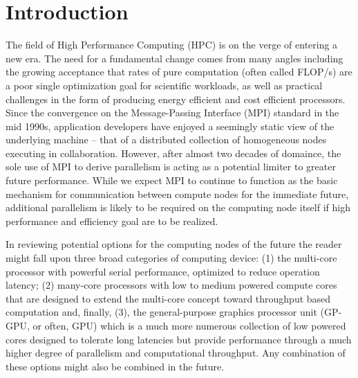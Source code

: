 

\section{Introduction}
\label{C:intro}

\noindent
The field of High Performance Computing (HPC) is on the verge of entering a new era. The need
for a fundamental change comes from many angles including the growing acceptance that rates of
pure computation (often called FLOP/s) are a poor single optimization goal for scientific
workloads, as well as practical challenges in the form of producing energy efficient and cost
efficient processors. Since the convergence on the Message-Passing Interface (MPI) standard
in the mid 1990s, application developers have enjoyed a seemingly static view of the 
underlying machine --
that of a distributed collection of homogeneous nodes executing in collaboration. However, 
after almost two decades of domaince, the sole use of MPI to derive parallelism is acting as
a potential limiter to greater future performance. While we expect MPI to continue to function
as the basic mechanism for communication between compute nodes for the immediate future, 
additional parallelism is
likely to be required on the computing node itself if high performance and efficiency goal 
are to be realized.

In reviewing potential options for the computing nodes of the future the reader might fall
upon three broad categories of computing device: (1) the multi-core processor with powerful
serial performance, optimized to reduce operation latency; (2) many-core processors with
low to medium powered compute cores that are designed to extend the multi-core concept toward
throughput based computation and, finally, (3), the general-purpose graphics processor unit
(GP-GPU, or often, GPU) which is a much more numerous collection of low powered cores designed
to tolerate long latencies but provide performance through a much higher degree of 
parallelism and computational throughput. Any combination of these options might also be 
combined in the future.

